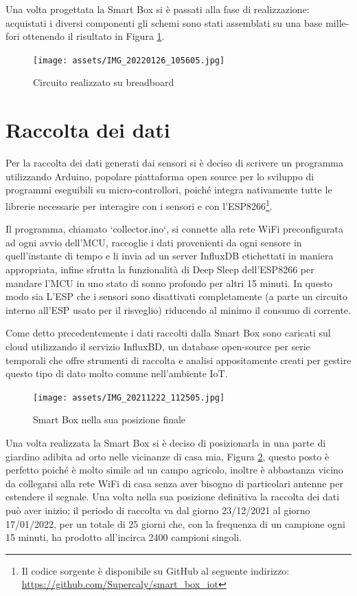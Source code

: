 \documentclass[fleqn, 12pt]{SelfArx}
\begin{document}
Una volta progettata la Smart Box si è passati alla fase di realizzazione: acquistati i diversi componenti gli schemi sono stati assemblati su una base mille-fori ottenendo il risultato in Figura \ref{fig:assembled}.

\begin{figure}[htb]
\centering
\texttt{[image: assets/IMG\_20220126\_105605.jpg]}
\caption{Circuito realizzato su breadboard}
\label{fig:assembled}
\end{figure}

\section{Raccolta dei dati}

Per la raccolta dei dati generati dai sensori si è deciso di scrivere un programma utilizzando Arduino\cite{arduino}, popolare piattaforma open source per lo sviluppo di programmi eseguibili su micro-controllori, poiché 
integra nativamente tutte le librerie necessarie per interagire con i sensori e con l'ESP8266\footnote{Il codice sorgente è disponibile su GitHub al seguente indirizzo: 
\url{https://github.com/Supercaly/smart_box_iot}}. 

Il programma, chiamato `collector.ino`, si connette alla rete WiFi preconfigurata ad ogni avvio dell'MCU, raccoglie i dati provenienti da ogni sensore in quell'instante di tempo e li invia ad un server InfluxDB\cite{influxdb} 
etichettati in maniera appropriata, infine sfrutta la funzionalità di Deep Sleep dell'ESP8266 per mandare l'MCU in uno stato di sonno profondo per altri 15 minuti. In questo modo sia L'ESP che i sensori sono 
disattivati completamente (a parte un circuito interno all'ESP usato per il risveglio) riducendo al minimo il consumo di corrente.

Come detto precedentemente i dati raccolti dalla Smart Box sono caricati sul cloud utilizzando il servizio InfluxBD, un database open-source per serie temporali che offre strumenti di raccolta e analisi appositamente 
creati per gestire questo tipo di dato molto comune nell'ambiente IoT.

\begin{figure}[htb]
\centering
\texttt{[image: assets/IMG\_20211222\_112505.jpg]}
\caption{Smart Box nella sua posizione finale}
\label{fig:inplace}
\end{figure}

Una volta realizzata la Smart Box si è deciso di posizionarla in una parte di giardino adibita ad orto nelle vicinanze di casa mia, Figura \ref{fig:inplace}, questo posto è perfetto poiché è molto simile ad un campo agricolo, 
inoltre è abbastanza vicino da collegarsi alla rete WiFi di casa senza aver bisogno di particolari antenne per estendere il segnale. 
Una volta nella sua posizione definitiva la raccolta dei dati può aver inizio; il periodo di raccolta va dal giorno 23/12/2021 al giorno 17/01/2022, per un totale di 25 giorni che, con la frequenza di un campione 
ogni 15 minuti, ha prodotto all'incirca 2400 campioni singoli.
\end{document}
